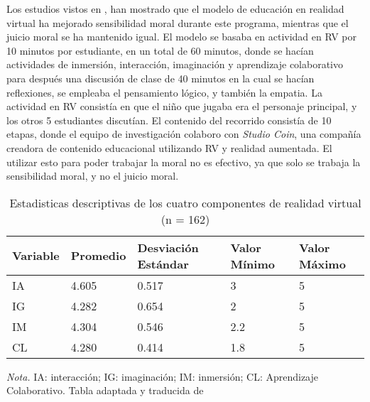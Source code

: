 Los estudios vistos en \cite{SHIM2023100010}, han mostrado que el modelo de educación en realidad virtual ha mejorado sensibilidad moral durante este programa, mientras que el juicio moral se ha mantenido igual. El modelo se basaba en actividad en RV por 10 minutos por estudiante, en un total de 60 minutos, donde se hacían actividades de inmersión, interacción, imaginación y aprendizaje colaborativo para después una discusión de clase de 40 minutos en la cual se hacían reflexiones, se empleaba el pensamiento lógico, y también la empatia. La actividad en RV consistía en que el niño que jugaba era el personaje principal, y los otros 5 estudiantes discutían. El contenido del recorrido consistía de 10 etapas, donde el equipo de investigación colaboro con \textit{Studio Coin}, una compañía creadora de contenido educacional utilizando RV y realidad aumentada. El utilizar esto para poder trabajar la moral no es efectivo, ya que solo se trabaja la sensibilidad moral, y no el juicio moral.
\begin{table}[H]
   \caption{Estadisticas descriptivas de los cuatro componentes de realidad virtual (n = 162)}
   \label{tab:statsmoralvr}
   \begin{center}
      \begin{tabular}{p{2cm} p{2cm} p{2cm} p{2cm} p{2cm}}
         \hline
         Variable & Promedio & Desviación Estándar & Valor Mínimo & Valor Máximo\\
         \hline
         IA & 4.605 & 0.517 & 3 & 5\\
         IG & 4.282 & 0.654 & 2 & 5\\
         IM & 4.304 & 0.546 & 2.2 & 5\\
         CL & 4.280 & 0.414 & 1.8 & 5\\
         \hline
      \end{tabular}
   \end{center}
      \textit{Nota. }IA: interacción; IG: imaginación; IM: inmersión; CL: Aprendizaje Colaborativo. Tabla adaptada y traducida de \cite{SHIM2023100010}
\end{table}
